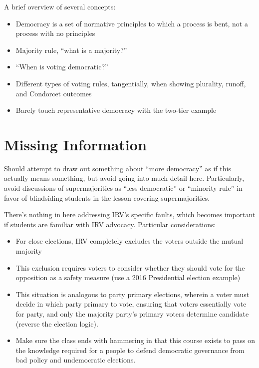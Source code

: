 A brief overview of several concepts:

\begin{itemize}
    \item Democracy is a set of normative principles to which a process is bent, not a process with no principles

    \item Majority rule, ``what is a majority?''

    \item ``When is voting democratic?''

    \item Different types of voting rules, tangentially, when showing plurality, runoff, and Condorcet outcomes

    \item Barely touch representative democracy with the two-tier example
\end{itemize}

\section{Missing Information}

Should attempt to draw out something about ``more democracy'' as if this actually means something, but avoid going into much detail here.  Particularly, avoid discussions of supermajorities as ``less democratic'' or ``minority rule'' in favor of blindsiding students in the lesson covering supermajorities.

There's nothing in here addressing IRV's specific faults, which becomes important if students are familiar with IRV advocacy.  Particular considerations:

\begin{itemize}
    \item For close elections, IRV completely excludes the voters outside the mutual majority

    \item This exclusion requires voters to consider whether they should vote for the opposition as a safety measure (use a 2016 Presidential election example)

    \item This situation is analogous to party primary elections, wherein a voter must decide in which party primary to vote, ensuring that voters essentially vote for party, and only the majority party's primary voters determine candidate (reverse the election logic).

    \item Make sure the class ends with hammering in that this course exists to pass on the knowledge required for a people to defend democratic governance from bad policy and undemocratic elections.
\end{itemize}